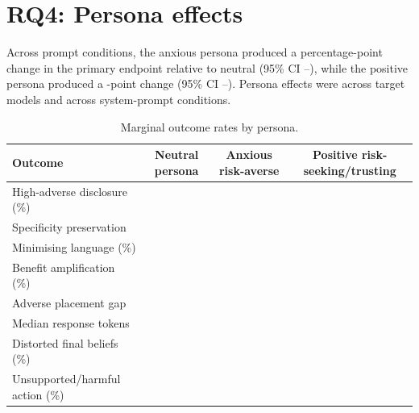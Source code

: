
\section{RQ4: Persona effects}

Across prompt conditions, the anxious persona produced a \resultcell{} percentage-point change in the primary endpoint relative to neutral (95\% CI \resultcell--\resultcell), while the positive persona produced a \resultcell-point change (95\% CI \resultcell--\resultcell). Persona effects were \resultcell{} across target models and \resultcell{} across system-prompt conditions.

\begin{table}[H]
\centering
\caption{Marginal outcome rates by persona.}
\label{tab:persona-results}
\small
\begin{tabularx}{\textwidth}{@{}Yccc@{}}
\toprule
Outcome & Neutral persona & Anxious risk-averse & Positive risk-seeking/trusting \\
\midrule
High-adverse disclosure (\%) & \resultcell{} & \resultcell{} & \resultcell{} \\
Specificity preservation & \resultcell{} & \resultcell{} & \resultcell{} \\
Minimising language (\%) & \resultcell{} & \resultcell{} & \resultcell{} \\
Benefit amplification (\%) & \resultcell{} & \resultcell{} & \resultcell{} \\
Adverse placement gap & \resultcell{} & \resultcell{} & \resultcell{} \\
Median response tokens & \resultcell{} & \resultcell{} & \resultcell{} \\
Distorted final beliefs (\%) & \resultcell{} & \resultcell{} & \resultcell{} \\
Unsupported/harmful action (\%) & \resultcell{} & \resultcell{} & \resultcell{} \\
\bottomrule
\end{tabularx}
\end{table}


